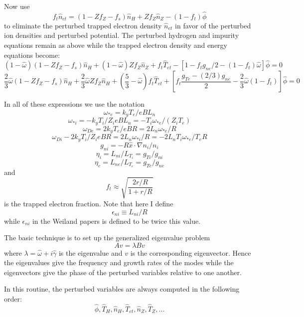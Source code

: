 Now use
\[ f_t \hat{n}_{et} = ( 1 - Z f_Z - f_s ) \hat{n}_H
   + Z f_Z \hat{n}_Z - ( 1 - f_t ) \hat{\phi} \]
to eliminate the perturbed trapped electron density $\hat{n}_{et}$
in favor of the perturbed ion densities and perturbed potential.
The perturbed hydrogen and impurity equations remain as above
while the trapped electron density and energy equations become:
\[ (1-\hat{\omega}) ( 1 - Z f_Z - f_s ) \hat{n}_H
 + (1-\hat{\omega}) Z f_Z \hat{n}_Z  + f_t \hat{T}_{et}
 - [ 1 - f_t g_{ne} / 2 - ( 1 - f_t ) \hat{\omega} ] \hat{\phi}
 = 0 \]
\[ \frac{2}{3} \hat{\omega} ( 1 - Z f_Z - f_s ) \hat{n}_H
 + \frac{2}{3} \hat{\omega} Z f_Z \hat{n}_H
 + \left( \frac{5}{3} - \hat{\omega} \right) f_t \hat{T}_{et}
 + \left[ f_t \frac{g_{Te} - (2/3) g_{ne}}{2}
   - \frac{2}{3} \hat{\omega} ( 1 - f_t ) \right] \hat{\phi}
 = 0  \]

In all of these expressions we use the notation
$$ \omega_{*e} = k_y T_e / e B L_n $$
$$ \omega_{*i} = - k_y T_i / Z_i e B L_n
    = - T_i \omega_{*e} / ( Z_i T_e ) $$
$$ \omega_{De} = 2 k_y T_e / e B R = 2 L_n \omega_{*e} / R $$
$$ \omega_{Di} - 2 k_y T_i / Z_i e B R = 2 L_n \omega_{*i} / R
   = - 2 L_n T_i \omega_{*e} / T_e R $$
$$ g_{ni} = - R \hat{x} \cdot \nabla n_i / n_i $$
$$ \eta_i = L_{ni} / L_{T_i} = g_{Ti} / g_{ni}  $$
$$ \eta_e = L_{ne} / L_{T_e} = g_{Te} / g_{ne} $$
and
$$ f_t \approx \sqrt{ \frac{ 2 r/R }{ 1 + r/R } } $$
is the trapped electron fraction.
Note that here I define 
\[ \epsilon_{ni} \equiv L_{ni} / R \]
while $ \epsilon_{ni} $ in the Weiland papers is defined to be
twice this value.

The basic technique is to set up the generalized eigenvalue problem
\[ A v = \lambda B v \]
where $ \lambda = \hat{\omega} + i \hat{\gamma} $ is the eigenvalue
and $ v $ is the corresponding eigenvector.
Hence the eigenvalues give the frequency and growth rates of the
modes while the eigenvectors give the phase of the perturbed
variables relative to one another.

In this routine, the perturbed variables are always computed in
the following order:
\[ \hat{\phi}, \hat{T}_H, \hat{n}_H, \hat{T}_{et},
    \hat{n}_Z, \hat{T}_Z, \ldots \]


